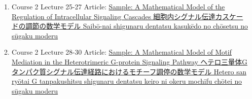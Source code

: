 \documentclass[preprint, 8pt]{elsarticle}
\theoremstyle{definition}
\begin{document}
\begin{CJK}{UTF8}{min}
\begin{enumerate}
\item Course 2 Lecture 25-27 Article: \href{}{Sample: A Mathematical Model of the Regulation of Intracellular Signaling Cascades 細胞内シグナル伝達カスケードの調節の数学モデル Saibō-nai shigunaru dentatsu kasukēdo no chōsetsu no sūgaku moderu}
\item Course 2 Lecture 28-30 Article: \href{}{Sample: A Mathematical Model of Motif Mediation in the Heterotrimeric G-protein Signaling Pathway ヘテロ三量体Gタンパク質シグナル伝達経路におけるモチーフ調停の数学モデル Hetero san ryōtai G tanpakushitsu shigunaru dentatsu keiro ni okeru mochīfu chōtei no sūgaku moderu}
\end{enumerate}


\end{CJK}
\end{document}
